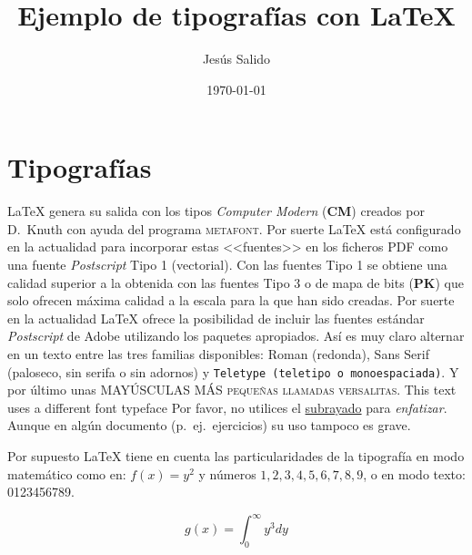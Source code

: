 \documentclass[11pt,a4paper]{article}
\title{Ejemplo de tipografías con \LaTeX}
\author{Jesús Salido}
\date{\today}
\begin{document}
\maketitle


\section{Tipografías}
\LaTeX{} genera su salida con los tipos \emph{Computer Modern} (\textbf{CM}) creados por D.~Knuth con ayuda del programa \textsc{metafont}. Por suerte \LaTeX{} está configurado en la actualidad para incorporar estas <<fuentes>> en los ficheros PDF como una fuente \emph{Postscript} Tipo 1 (vectorial). Con las fuentes Tipo 1 se obtiene una calidad superior a la obtenida con las fuentes Tipo 3 o de mapa de bits (\textbf{PK}) que solo ofrecen máxima calidad a la escala para la que han sido creadas. Por suerte en la actualidad \LaTeX{} ofrece la posibilidad de incluir las fuentes estándar \emph{Postscript} de \textsf{Adobe} utilizando los paquetes apropiados. Así es muy claro alternar en un texto entre las tres familias disponibles: Roman (redonda), \textsf{Sans Serif (paloseco, sin serifa o sin adornos)} y \texttt{Teletype (teletipo o monoespaciada)}. Y por último unas MAYÚSCULAS MÁS \textsc{pequeñas llamadas versalitas}. {\selectfont
This text uses a different font typeface
}
Por favor, no utilices el \underline{subrayado} para \emph{enfatizar}. Aunque en algún documento (p.~ej.\ ejercicios) su uso tampoco es grave.

Por supuesto \LaTeX{} tiene en cuenta las particularidades de la tipografía en modo matemático como en: $f(x)=y^2$ y números $1,2,3,4,5,6,7,8,9$, o en modo texto: 0123456789.

$$g(x)=\int_{0}^{\infty}y^{3}dy$$
\end{document}
